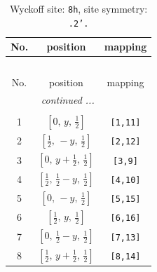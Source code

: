 \documentclass[fleqn,8pt]{jsarticle}
\begin{document}
\begin{longtable}{ccc}
\caption{Wyckoff site: {\tt 8h}, site symmetry: {\tt .2'.}}
 \\
 \hline \hline
No. & position & mapping \\ \hline \endfirsthead

\multicolumn{2}{l}{\tablename\ \thetable{}} \\
 \hline \hline
No. & position & mapping \\ \hline \endhead

 \hline \hline
\multicolumn{2}{r}{\footnotesize\it continued ...} \\ \endfoot

 \hline \hline
\multicolumn{2}{r}{} \\ \endlastfoot

1 & $\left[ 0,\, y,\, \frac{1}{2} \right]$ & {\tt [1,11]} \\ \hline
2 & $\left[ \frac{1}{2},\, - y,\, \frac{1}{2} \right]$ & {\tt [2,12]} \\ \hline
3 & $\left[ 0,\, y + \frac{1}{2},\, \frac{1}{2} \right]$ & {\tt [3,9]} \\ \hline
4 & $\left[ \frac{1}{2},\, \frac{1}{2} - y,\, \frac{1}{2} \right]$ & {\tt [4,10]} \\ \hline
5 & $\left[ 0,\, - y,\, \frac{1}{2} \right]$ & {\tt [5,15]} \\ \hline
6 & $\left[ \frac{1}{2},\, y,\, \frac{1}{2} \right]$ & {\tt [6,16]} \\ \hline
7 & $\left[ 0,\, \frac{1}{2} - y,\, \frac{1}{2} \right]$ & {\tt [7,13]} \\ \hline
8 & $\left[ \frac{1}{2},\, y + \frac{1}{2},\, \frac{1}{2} \right]$ & {\tt [8,14]} \\
\end{longtable}
\renewcommand{\arraystretch}{1.2}
\end{document}
